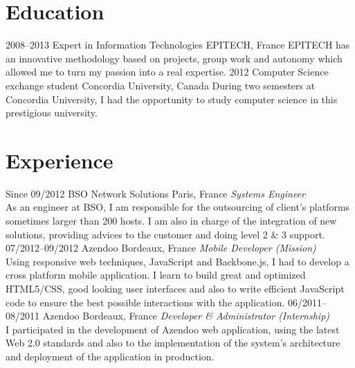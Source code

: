 \documentclass[print]{gmorpain-cv} %
\begin{document}
\section{Education}
\begin{entrylist}
\entry
{2008--2013}
{Expert {\normalfont in Information Technologies}}
{EPITECH, France}
{EPITECH has an innovative methodology based on projects, group work and autonomy which allowed me to turn my passion into a real expertise.}
\entry
{2012}
{Computer Science {\normalfont exchange student}}
{Concordia University, Canada}
{During two semesters at Concordia University, I had the opportunity to study computer science in this prestigious university.}
\end{entrylist}


\section{Experience}
\begin{entrylist}
\entry
{Since 09/2012}
{BSO Network Solutions}
{Paris, France}
{\emph{Systems Engineer} \\
As an engineer at BSO, I am responsible for the outsourcing of client's platforms sometimes larger than 200 hosts. I am also in charge of the integration of new solutions, providing advices to the customer and doing level 2 \& 3 support.}
\entry
{07/2012--09/2012}
{Azendoo}
{Bordeaux, France}
{\emph{Mobile Developer (Mission)} \\
Using responsive web techniques, JavaScript and Backbone.js, I had to develop a cross platform mobile application. I learn to build great and optimized HTML5/CSS, good looking user interfaces and also to write efficient JavaScript code to ensure the best possible interactions with the application.}
\entry
{06/2011--08/2011}
{Azendoo}
{Bordeaux, France}
{\emph{Developer \& Administrator (Internship)} \\
I participated in the development of Azendoo web application, using the latest Web 2.0 standards and also to the implementation of the system’s architecture and deployment of the application in production.}
\end{entrylist}
\end{document}

